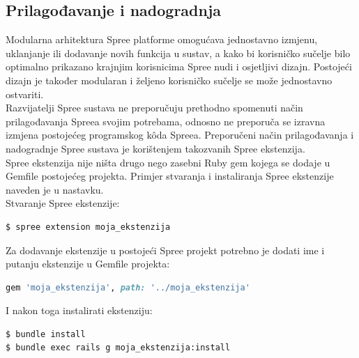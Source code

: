 
\subsection{Prilagođavanje i nadogradnja}

Modularna arhitektura Spree platforme omogućava jednostavno izmjenu, uklanjanje ili dodavanje novih funkcija u sustav, a kako bi korisničko sučelje bilo optimalno prikazano krajnjim korisnicima Spree nudi i osjetljivi dizajn. 
Postojeći dizajn je također modularan i željeno korisničko sučelje se može jednostavno ostvariti.
\\
Razvijatelji Spree sustava ne preporučuju prethodno spomenuti način prilagođavanja Spreea svojim potrebama, odnosno ne preporuča se izravna izmjena postojećeg programskog kôda Spreea. 
Preporučeni način prilagođavanja i nadogradnje Spree sustava je korištenjem takozvanih Spree ekstenzija.
\\
Spree ekstenzija nije ništa drugo nego zasebni Ruby gem kojega se dodaje u Gemfile postojećeg projekta. 
Primjer stvaranja i instaliranja Spree ekstenzije naveden je u nastavku.
\\

Stvaranje Spree ekstenzije:
\begin{lstlisting}[language=bash]
$ spree extension moja_ekstenzija
\end{lstlisting}

Za dodavanje ekstenzije u postojeći Spree projekt potrebno je dodati ime i putanju ekstenzije u Gemfile projekta:
\begin{lstlisting}[language=ruby]
gem 'moja_ekstenzija', path: '../moja_ekstenzija'
\end{lstlisting}

I nakon toga instalirati ekstenziju:
\begin{lstlisting}[language=bash]
$ bundle install
$ bundle exec rails g moja_ekstenzija:install
\end{lstlisting}

